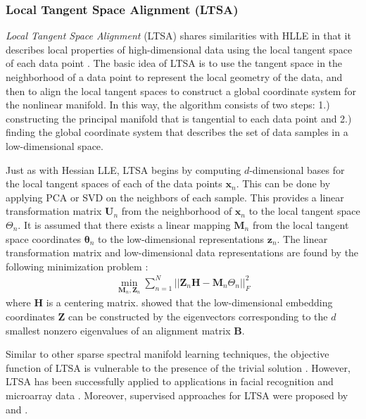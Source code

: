\subsubsection{Local Tangent Space Alignment (LTSA)} \label{sec:LTSA}
\textit{Local Tangent Space Alignment} (LTSA) \citep{Zhang2002LTSA} shares similarities with HLLE in that it describes local properties of high-dimensional data using the local tangent space of each data point \citep{VanDerMaaten2009DRReview}.  The basic idea of LTSA is to use the tangent space in the neighborhood of a data point to represent the local geometry of the data, and then to align the local tangent spaces to construct a global coordinate system for the nonlinear manifold.  In this way, the algorithm consists of two steps: 1.) constructing the principal manifold that is tangential to each data point and 2.) finding the global coordinate system that describes the set of data samples in a low-dimensional space.

Just as with Hessian LLE, LTSA begins by computing $d$-dimensional bases for the local tangent spaces of each of the data points $\bm{x}_{n}$.  This can be done by applying PCA or SVD on the neighbors of each sample.  This provides a linear transformation matrix $\bm{U}_{n}$ from the neighborhood of $\bm{x}_{n}$ to the local tangent space $\Theta_{n}$.  It is assumed that there exists a linear mapping $\bm{M}_{n}$ from the local tangent space coordinates $\bm{\theta}_{n}$ to the low-dimensional representations $\bm{z}_{n}$.  The linear transformation matrix and low-dimensional data representations are found by the following minimization problem \citep{Sorzano2014DRReview}:
\begin{align}
	\min_{\bm{M}_{n},\bm{Z}_{n}} \sum_{n=1}^{N} ||\bm{Z}_{n}\bm{H} - \bm{M}_{n}\Theta_{n} ||^{2}_{F}
\end{align}
\noindent
where $\bm{H}$ is a centering matrix.  \cite{Zhang2002LTSA} showed that the low-dimensional embedding coordinates $\bm{Z}$ can be constructed by the eigenvectors corresponding to the $d$ smallest nonzero eigenvalues of an alignment matrix $\bm{B}$.  

Similar to other sparse spectral manifold learning techniques, the objective function of LTSA is vulnerable to the presence of the trivial solution \citep{VanDerMaaten2009DRReview}.  However, LTSA has been successfully applied to applications in facial recognition \citep{Zhang2007LTSAFaceRecognition} and microarray data \citep{VanDerMaaten2009DRReview}.  Moreover, supervised approaches for LTSA were proposed by \cite{Li2005SupervisedLTSA} and \cite{Ma2010SupervisedLTTSA}.

